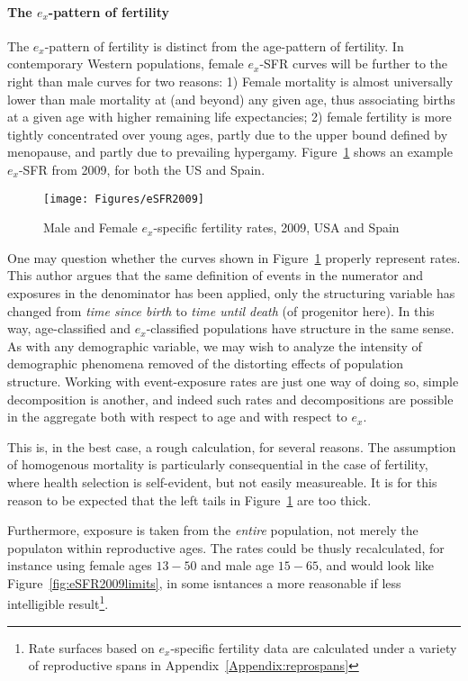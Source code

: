 \paragraph{The $e_x$-pattern of fertility}

The $e_x$-pattern of fertility is distinct from the age-pattern of fertility. 
In contemporary Western populations, female $e_x$-SFR curves will be
further to the right than male curves for two reasons: 1) Female mortality is
almost universally lower than male mortality at (and beyond) any given age,
thus associating births at a given age with higher remaining life expectancies; 2)
female fertility is more tightly concentrated over young ages, partly due to the
upper bound defined by menopause, and partly due to prevailing hypergamy.
Figure~\ref{fig:eSFR2009} shows an example $e_x$-SFR from 2009, for both the US and Spain.

\begin{figure}[ht!]
        \centering  
          \caption{Male and Female $e_x$-specific fertility rates, 2009, USA and
          Spain}
           \texttt{[image: Figures/eSFR2009]}
          \label{fig:eSFR2009}
\end{figure}

One may question whether the curves shown in Figure~\ref{fig:eSFR2009} properly
represent rates. This author argues that the same definition of events in the
numerator and exposures in the denominator has been applied, only the
structuring variable has changed from \textit{time since birth} to \textit{time
until death} (of progenitor here). In this way, age-classified and
$e_x$-classified populations have structure in the same sense. As with any
demographic variable, we may wish to analyze the intensity of demographic
phenomena removed of the distorting effects of population structure.
Working with event-exposure rates are just one way of doing so, simple
decomposition is another, and indeed such rates and decompositions are possible
in the aggregate both with respect to age and with respect to
$e_x$.

This is, in the best case, a rough calculation, for several reasons. The
assumption of homogenous mortality is particularly consequential in the case of 
fertility, where health selection is self-evident, but not easily measureable.
It is for this reason to be expected that the left tails in
Figure~\ref{fig:eSFR2009} are too thick. 

Furthermore, exposure is taken from the \textit{entire} population, not merely
the populaton within reproductive ages. The rates could be thusly recalculated,
for instance using female ages $13-50$ and male age $15-65$, and would look like 
Figure~\ref{fig:eSFR2009limits}, in some isntances a more reasonable if less
intelligible result\footnote{Rate surfaces based on $e_x$-specific fertility
data are calculated under a variety of reproductive spans in
Appendix~\ref{Appendix:reprospans}}.

